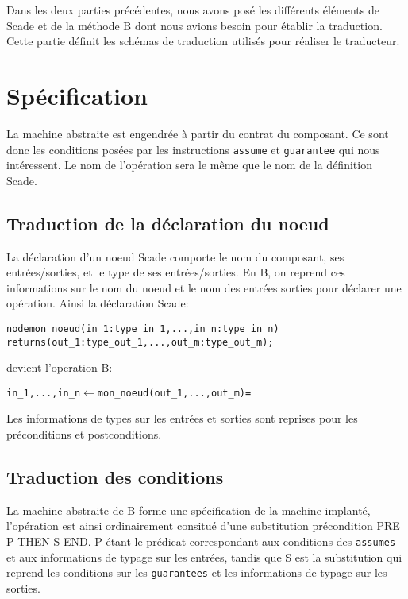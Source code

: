 


Dans les deux parties précédentes, nous avons posé les différents
éléments de Scade et de la méthode B dont nous avions besoin pour
établir la traduction. Cette partie définit les schémas de traduction
utilisés pour réaliser le traducteur. \\

\section{Spécification}

La machine abstraite est engendrée à partir du contrat du composant. Ce sont
donc les conditions posées par les instructions \texttt{assume} et
\texttt{guarantee} qui nous intéressent. Le nom de l'opération sera le même que le
nom de la définition Scade. 

\subsection{Traduction de la déclaration du noeud}
La déclaration d'un noeud Scade comporte le nom du composant, ses
entrées/sorties, et le type de ses entrées/sorties. En B, on reprend ces
informations sur le nom du noeud et le nom des entrées sorties pour déclarer une
opération. Ainsi la déclaration Scade: 
\begin{alltt}
node mon\_noeud (in_1: type\_in_1, ..., in_n: type\_in_n) 
                returns (out_1: type\_out_1, ..., out_m: type\_out_m);
\end{alltt}
devient l'operation B:
\begin{alltt}
in_1, ..., in_n \(\leftarrow\) mon\_noeud(out_1, ..., out_m) =
\end{alltt}

Les informations de types sur les entrées et sorties sont reprises pour les
préconditions et postconditions.


\subsection{Traduction des conditions}

La machine abstraite de B forme une spécification de la machine implanté,
l'opération est ainsi ordinairement consitué d'une substitution précondition
PRE P THEN S END. P étant le prédicat correspondant aux conditions des
\texttt{assumes} et aux informations de typage sur les entrées, tandis que S est
la substitution qui reprend les conditions sur les \texttt{guarantees} et les informations de typage
sur les sorties. 

